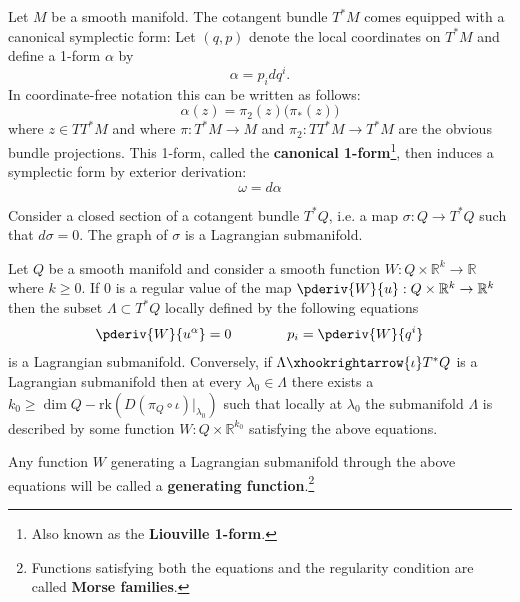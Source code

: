 	\begin{construct}
		Let $M$ be a smooth manifold. The cotangent bundle $T^*M$ comes equipped with a canonical symplectic form: Let $(q, p)$ denote the local coordinates on $T^*M$ and define a 1-form $\alpha$ by \[\alpha = p_idq^i.\] In coordinate-free notation this can be written as follows:
		\begin{equation}
			\alpha(z) = \pi_2(z)\Big(\pi_*(z)\Big)
		\end{equation}
		where $z\in TT^*M$ and where $\pi: T^*M\rightarrow M$ and $\pi_2:TT^*M\rightarrow T^*M$ are the obvious bundle projections. This 1-form, called the \textbf{canonical 1-form}\footnote{Also known as the \textbf{Liouville 1-form}.}, then induces a symplectic form by exterior derivation: \[\omega = d\alpha\]
	\end{construct}
	
	\begin{property}\label{diff:closed_section_submanifold}
		Consider a closed section of a cotangent bundle $T^*Q$, i.e. a map $\sigma:Q\rightarrow T^*Q$ such that $d\sigma=0$. The graph of $\sigma$ is a Lagrangian submanifold.
	\end{property}
	
	\begin{theorem}
		Let $Q$ be a smooth manifold and consider a smooth function $W:Q\times\mathbb{R}^k\rightarrow\mathbb{R}$ where $k\geq 0$. If 0 is a regular value of the map $\pderiv{W}{u}:Q\times\mathbb{R}^k\rightarrow\mathbb{R}^k$ then the subset $\Lambda\subset T^*Q$ locally defined by the following equations
		\begin{gather}
			\pderiv{W}{u^\alpha} = 0\qquad\qquad p_i=\pderiv{W}{q^i}
		\end{gather}
		is a Lagrangian submanifold. Conversely, if $\Lambda\xhookrightarrow{\iota}T^*Q$ is a Lagrangian submanifold then at every $\lambda_0\in\Lambda$ there exists a $k_0\geq\dim Q - \text{rk}\left(D(\pi_Q\circ\iota)|_{\lambda_0}\right)$ such that locally at $\lambda_0$ the submanifold $\Lambda$ is described by some function $W:Q\times\mathbb{R}^{k_0}$ satisfying the above equations.
	\end{theorem}
	Any function $W$ generating a Lagrangian submanifold through the above equations will be called a \textbf{generating function}.\footnote{Functions satisfying both the equations and the regularity condition are called \textbf{Morse families}.}

